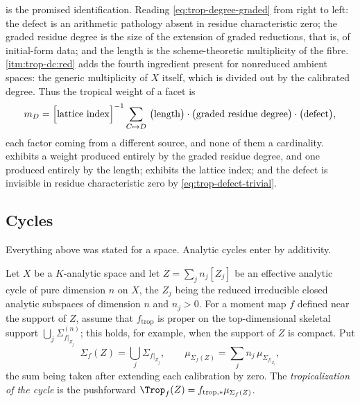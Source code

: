 \begin{remark}
\label{rem:trop-degree-graded-reading}
 is the promised identification. Reading
\eqref{eq:trop-degree-graded} from right to left: the defect is an
arithmetic pathology absent in residue characteristic zero; the graded
residue degree is the size of the extension of graded reductions, that is,
of initial-form data; and the length is the scheme-theoretic multiplicity of
the fibre.  \cref{itm:trop-dc:red} adds the
fourth ingredient present for nonreduced ambient spaces: the generic
multiplicity of $X$ itself, which is divided out by the calibrated degree.
Thus the tropical weight of a facet is
\[
 m_D=\Bigl[\text{lattice index}\Bigr]^{-1}
 \sum_{C\mapsto D}\ \bigl(\text{length}\bigr)\cdot
 \bigl(\text{graded residue degree}\bigr)\cdot\bigl(\text{defect}\bigr),
\]
each factor coming from a different source, and none of them a cardinality.
 exhibits a weight produced entirely by the
graded residue degree, and  one produced
entirely by the length;  exhibits the lattice
index; and the defect is invisible in residue characteristic zero by
\eqref{eq:trop-defect-trivial}.
\end{remark}

\subsection{Cycles}

Everything above was stated for a space. Analytic cycles enter by
additivity.

\begin{definition}
\label{def:trop-cycle-calibration}
Let $X$ be a $K$-analytic space and let $Z=\sum_j n_j[Z_j]$ be an effective
analytic cycle of pure dimension $n$ on $X$, the $Z_j$ being the reduced
irreducible closed analytic subspaces of dimension $n$ and $n_j>0$. For a
moment map $f$ defined near the support of $Z$, assume that
$f_{\mathrm{trop}}$ is proper on the top-dimensional skeletal support
$\bigcup_j\Sigma_{f|_{Z_j}}^{(n)}$; this holds, for example, when the support
of $Z$ is compact. Put
\[
 \Sigma_f(Z)=\bigcup_j\Sigma_{f|_{Z_j}},
 \qquad
 \mu_{\Sigma_f(Z)}=\sum_jn_j\,\mu_{\Sigma_{f|_{Z_j}}},
\]
the sum being taken after extending each calibration by zero. The
\emph{tropicalization of the cycle} is the pushforward
$\Trop_f(Z)=f_{\mathrm{trop},*}\mu_{\Sigma_f(Z)}$.
\end{definition}

